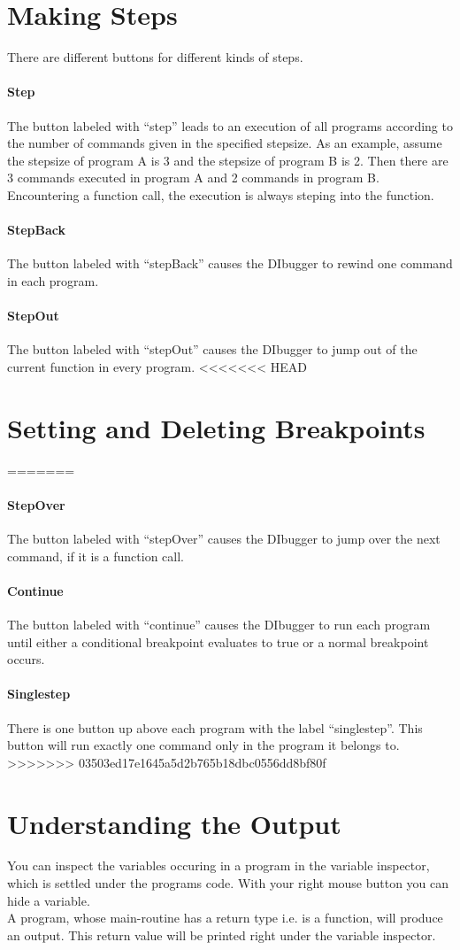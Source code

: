 \documentclass[parskip=full]{memoir}
\begin{document}
\section{Making Steps}
There are different buttons for different kinds of steps.
\paragraph{Step}
The button labeled with \enquote{step} leads to an execution of all programs according to the number of commands given in the specified stepsize. As an example, assume the stepsize of program A is 3 and the stepsize of program B is 2. Then there are 3 commands executed in program A and 2 commands in program B. Encountering a function call, the execution is always steping into the function.
\paragraph{StepBack}
The button labeled with \enquote{stepBack} causes the DIbugger to rewind one command in each program.
\paragraph{StepOut}
The button labeled with \enquote{stepOut} causes the DIbugger to jump out of the current function in every program.
<<<<<<< HEAD

\section{Setting and Deleting Breakpoints}
=======
\paragraph{StepOver}
The button labeled with \enquote{stepOver} causes the DIbugger to jump over the next command, if it is a function call.
\paragraph{Continue}
The button labeled with \enquote{continue} causes the DIbugger to run each program until either a conditional breakpoint evaluates to true or a normal breakpoint occurs.
\paragraph{Singlestep}
There is one button up above each program with the label \enquote{singlestep}. This button will run exactly one command only in the program it belongs to.
>>>>>>> 03503ed17e1645a5d2b765b18dbc0556dd8bf80f
\section{Understanding the Output}
You can inspect the variables occuring in a program in the variable inspector, which is settled under the programs code. With your right mouse button you can hide a variable.\\
A program, whose main-routine has a return type i.e. is a function, will produce an output. 
This return value will be printed right under the variable inspector.
\end{document}
